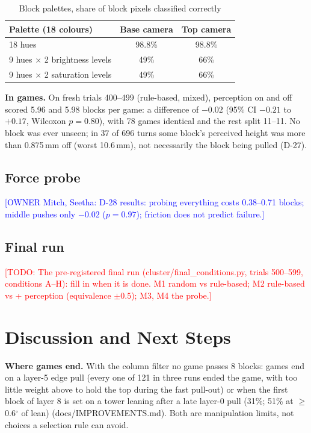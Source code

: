 \documentclass[conference]{IEEEtran}
\newcommand{\todo}[1]{\textcolor{red}{[TODO: #1]}}
\newcommand{\owner}[2]{\textcolor{blue}{[OWNER #1: #2]}}
\begin{document}
\begin{table}[t]
\caption{Block palettes, share of block pixels classified correctly}\label{tab:palette}
\centering
\begin{tabular}{lcc}
\toprule
Palette (18 colours) & Base camera & Top camera \\
\midrule
18 hues & 98.8\% & 98.8\% \\
9 hues $\times$ 2 brightness levels & 49\% & 66\% \\
9 hues $\times$ 2 saturation levels & 49\% & 66\% \\
\bottomrule
\end{tabular}
\end{table}

\textbf{In games.} On fresh trials 400--499 (rule-based, mixed), perception on and off scored 5.96 and 5.98 blocks per
game: a difference of $-0.02$ (95\% CI $-0.21$ to $+0.17$, Wilcoxon $p=0.80$), with 78 games identical and the rest split
11--11. No block was ever unseen; in 37 of 696 turns some block's perceived height was more than 0.875\,mm off (worst
10.6\,mm), not necessarily the block being pulled (D-27).

\subsection{Force probe}
\owner{Mitch, Seetha}{D-28 results: probing everything costs 0.38--0.71 blocks; middle pushes only $-0.02$ ($p=0.97$);
friction does not predict failure.}

\subsection{Final run}
\todo{The pre-registered final run (cluster/final\_conditions.py, trials 500--599, conditions A--H): fill in when it
is done.  M1 random vs rule-based; M2 rule-based vs + perception (equivalence $\pm0.5$); M3, M4 the probe.}

\section{Discussion and Next Steps}
\textbf{Where games end.} With the column filter no game passes 8 blocks: games end on a layer-5 edge pull (every one of
121 in three runs ended the game, with too little weight above to hold the top during the fast pull-out) or when the
first block of layer 8 is set on a tower leaning after a late layer-0 pull (31\%; 51\% at $\ge$0.6$^\circ$ of lean)
(docs/IMPROVEMENTS.md). Both are manipulation limits, not choices a selection rule can avoid.
\end{document}
